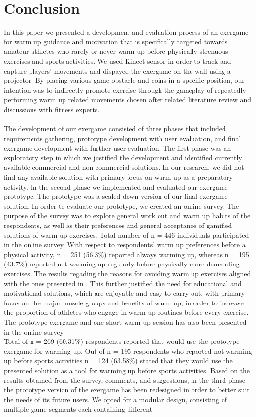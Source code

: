 \chapter{Conclusion}
\label{chap:conclusion}
In this paper we presented a development and evaluation process of an exergame for warm up guidance and motivation that is specifically targeted towards amateur athletes who rarely or never warm up before physically strenuous exercises and sports activities. We used Kinect sensor in order to track and capture players' movements and dispayed the exergame on the wall using a projector. By placing various game obstacle and coins in a specific position, our intention was to indirectly promote exercise through the gameplay of repeatedly performing warm up related movements chosen after related literature review and discussions with fitness experts.\\\\The development of our exergame consisted of three phases that included requirements gathering, prototype development with user evaluation, and final exergame development with further user evaluation. The first phase was an exploratory step in which we justified the development and identified currently available commercial and non-commercial solutions. In our research, we did not find any available solution with primary focus on warm up as a preparatory activity. In the second phase we implemented and evaluated our exergame prototype. The prototype was a scaled down version of our final exergame solution.  In order to evaluate our prototype, we created an online survey. The purpose of the survey was to explore general work out and warm up habits of the respondents, as well as their preferences and general acceptance of gamified solutions of warm up exercises.  Total number of n = 446 individuals participated in the online survey. With respect to respondents' warm up preferences before a physical activity, n = 251 (56.3\%) reported always warming up, whereas n = 195 (43.7\%) reported not warming up regularly before physically more demanding exercises. The results regading the reasons for avoiding warm up exercises aligned with the ones presented in \cite{fradkin2010effects}. This further justified the need for educational and motivational solutions, which are enjoyable and easy to carry out, with primary focus on the major muscle groups and benefits of warm up, in order to increase the proportion of athletes who engage in warm up routines before every exercise. The prototype exergame and one short warm up session has also been presented in the online survey. \\Total of n = 269 (60.31\%) respondents reported that would use the prototype exergame for warming up. Out of n = 195 respondents who reported not warming up before sports activities n = 124 (63.58\%) stated that they would use the presented solution as a tool for warming up before sports activities. Based on the results obtained from the survey, comments, and suggestions, in the third phase the prototype version of the exergame has been redesigned in order to better suit the needs of its future users. We opted for a modular design, consisting of multiple game segments each containing different 